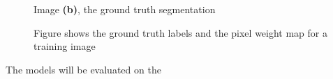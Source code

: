 \documentclass[a4paper,11pt]{article}
\begin{document}
\begin{figure}[H]
  Image \textbf{(b)}, the ground truth segmentation
\endminipage\hfill
\caption{Figure shows the ground truth labels and the pixel weight map for a training image}
\end{figure}
The models will be evaluated on the \cite{noauthor_2d_nodate}
\end{document}
